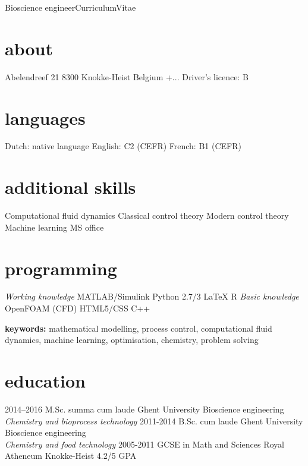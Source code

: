\documentclass[]{friggeri-cv}
\begin{document}
       {Bioscience engineer}{Curriculum}{Vitae}
\begin{aside}
  \section{about}
    Abelendreef 21
    8300 Knokke-Heist
    Belgium \vspace{0.21cm}
    +...
     \vspace{0.21cm}
    Driver's licence: B \vspace{-1.25mm}
  \section{languages}
    Dutch: native language
    English: C2 (CEFR)
    French:  B1  (CEFR) \vspace{3.3mm}
  \section{additional skills}
  Computational fluid dynamics
  Classical control theory 
  Modern control theory 
  Machine learning
  MS office \vspace{8mm}
  \section{programming} 
  \textit{Working knowledge}
  MATLAB/Simulink
  Python 2.7/3
  LaTeX
  R \vspace{0.1cm}
  \textit{Basic knowledge}
  OpenFOAM (CFD)
  HTML5/CSS
  C++
\end{aside}
\vspace{3mm}
\textbf{keywords:} mathematical modelling, process control, computational fluid dynamics, machine learning, optimisation, chemistry, problem solving
\vspace{3mm}

\section{education}
\begin{entrylist}
    \entry
    {2014–2016}
    {M.Sc. summa cum laude}
    {Ghent University}
    {Bioscience engineering\\
    \emph{Chemistry and bioprocess technology}}
  \entry
    {2011-2014}
    {B.Sc. cum laude}
    {Ghent University}
    {Bioscience engineering\\
    \emph{Chemistry and food technology}}
  \entry
    {2005-2011}
    {GCSE in Math and Sciences}
    {Royal Atheneum Knokke-Heist}
    {4.2/5 GPA}
\end{entrylist}
\end{document}
